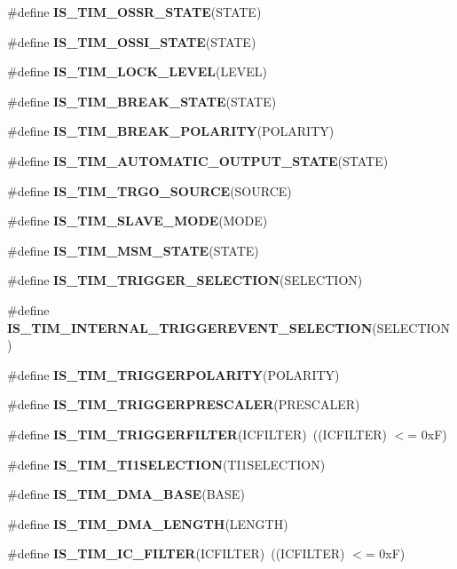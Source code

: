 \begin{DoxyCompactItemize}
\item 
\#define {\bfseries I\+S\+\_\+\+T\+I\+M\+\_\+\+O\+S\+S\+R\+\_\+\+S\+T\+A\+TE}(S\+T\+A\+TE)
\item 
\#define {\bfseries I\+S\+\_\+\+T\+I\+M\+\_\+\+O\+S\+S\+I\+\_\+\+S\+T\+A\+TE}(S\+T\+A\+TE)
\item 
\#define {\bfseries I\+S\+\_\+\+T\+I\+M\+\_\+\+L\+O\+C\+K\+\_\+\+L\+E\+V\+EL}(L\+E\+V\+EL)
\item 
\#define {\bfseries I\+S\+\_\+\+T\+I\+M\+\_\+\+B\+R\+E\+A\+K\+\_\+\+S\+T\+A\+TE}(S\+T\+A\+TE)
\item 
\#define {\bfseries I\+S\+\_\+\+T\+I\+M\+\_\+\+B\+R\+E\+A\+K\+\_\+\+P\+O\+L\+A\+R\+I\+TY}(P\+O\+L\+A\+R\+I\+TY)
\item 
\#define {\bfseries I\+S\+\_\+\+T\+I\+M\+\_\+\+A\+U\+T\+O\+M\+A\+T\+I\+C\+\_\+\+O\+U\+T\+P\+U\+T\+\_\+\+S\+T\+A\+TE}(S\+T\+A\+TE)
\item 
\#define {\bfseries I\+S\+\_\+\+T\+I\+M\+\_\+\+T\+R\+G\+O\+\_\+\+S\+O\+U\+R\+CE}(S\+O\+U\+R\+CE)
\item 
\#define {\bfseries I\+S\+\_\+\+T\+I\+M\+\_\+\+S\+L\+A\+V\+E\+\_\+\+M\+O\+DE}(M\+O\+DE)
\item 
\#define {\bfseries I\+S\+\_\+\+T\+I\+M\+\_\+\+M\+S\+M\+\_\+\+S\+T\+A\+TE}(S\+T\+A\+TE)
\item 
\#define {\bfseries I\+S\+\_\+\+T\+I\+M\+\_\+\+T\+R\+I\+G\+G\+E\+R\+\_\+\+S\+E\+L\+E\+C\+T\+I\+ON}(S\+E\+L\+E\+C\+T\+I\+ON)
\item 
\#define {\bfseries I\+S\+\_\+\+T\+I\+M\+\_\+\+I\+N\+T\+E\+R\+N\+A\+L\+\_\+\+T\+R\+I\+G\+G\+E\+R\+E\+V\+E\+N\+T\+\_\+\+S\+E\+L\+E\+C\+T\+I\+ON}(S\+E\+L\+E\+C\+T\+I\+ON)
\item 
\#define {\bfseries I\+S\+\_\+\+T\+I\+M\+\_\+\+T\+R\+I\+G\+G\+E\+R\+P\+O\+L\+A\+R\+I\+TY}(P\+O\+L\+A\+R\+I\+TY)
\item 
\#define {\bfseries I\+S\+\_\+\+T\+I\+M\+\_\+\+T\+R\+I\+G\+G\+E\+R\+P\+R\+E\+S\+C\+A\+L\+ER}(P\+R\+E\+S\+C\+A\+L\+ER)
\item 
\#define {\bfseries I\+S\+\_\+\+T\+I\+M\+\_\+\+T\+R\+I\+G\+G\+E\+R\+F\+I\+L\+T\+ER}(I\+C\+F\+I\+L\+T\+ER)~((I\+C\+F\+I\+L\+T\+ER) $<$= 0x\+F)\hypertarget{group___t_i_m___i_s___t_i_m___definitions_gaa1f78b846d7c6c3d54dd35f2ecdabd2f}{}\label{group___t_i_m___i_s___t_i_m___definitions_gaa1f78b846d7c6c3d54dd35f2ecdabd2f}

\item 
\#define {\bfseries I\+S\+\_\+\+T\+I\+M\+\_\+\+T\+I1\+S\+E\+L\+E\+C\+T\+I\+ON}(T\+I1\+S\+E\+L\+E\+C\+T\+I\+ON)
\item 
\#define {\bfseries I\+S\+\_\+\+T\+I\+M\+\_\+\+D\+M\+A\+\_\+\+B\+A\+SE}(B\+A\+SE)
\item 
\#define {\bfseries I\+S\+\_\+\+T\+I\+M\+\_\+\+D\+M\+A\+\_\+\+L\+E\+N\+G\+TH}(L\+E\+N\+G\+TH)
\item 
\#define {\bfseries I\+S\+\_\+\+T\+I\+M\+\_\+\+I\+C\+\_\+\+F\+I\+L\+T\+ER}(I\+C\+F\+I\+L\+T\+ER)~((I\+C\+F\+I\+L\+T\+ER) $<$= 0x\+F)\hypertarget{group___t_i_m___i_s___t_i_m___definitions_ga19ecc5fc2e1ce1697c3dbbb9809ca243}{}\label{group___t_i_m___i_s___t_i_m___definitions_ga19ecc5fc2e1ce1697c3dbbb9809ca243}

\end{DoxyCompactItemize}


